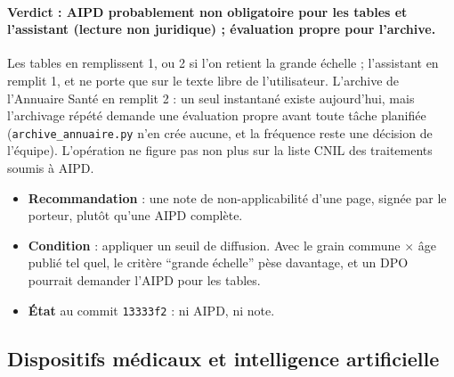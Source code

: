 \paragraph{Verdict : AIPD probablement non obligatoire pour les tables et l'assistant (lecture non juridique) ; évaluation propre pour l'archive.}
Les tables en remplissent 1, ou 2 si l'on retient la grande échelle ; l'assistant en remplit 1, et ne porte que sur le texte libre de l'utilisateur.
L'archive de l'Annuaire Santé en remplit 2 : un seul instantané existe aujourd'hui, mais l'archivage répété demande une évaluation propre avant toute tâche planifiée (\texttt{archive\_\allowbreak{}annuaire.py} n'en crée aucune, et la fréquence reste une décision de l'équipe).
L'opération ne figure pas non plus sur la liste CNIL des traitements soumis à AIPD.
\begin{itemize}
\item \textbf{Recommandation} : une note de non-applicabilité d'une page, signée par le porteur, plutôt qu'une AIPD complète.
\item \textbf{Condition} : appliquer un seuil de diffusion. Avec le grain commune $\times$ âge publié tel quel, le critère \enquote{grande échelle} pèse davantage, et un DPO pourrait demander l'AIPD pour les tables.
\item \textbf{État} au commit \texttt{13333f2} : ni AIPD, ni note.
\end{itemize}

\subsection{Dispositifs médicaux et intelligence artificielle}\label{conf:dm-ia}

